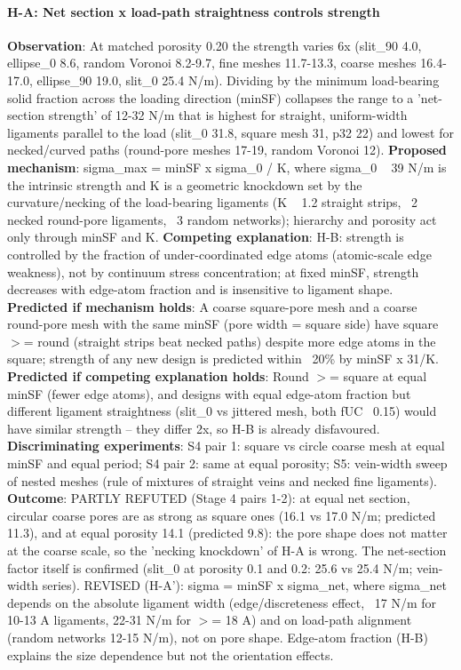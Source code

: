 \paragraph{H-A: Net section x load-path straightness controls strength} \textbf{Observation}: At matched porosity 0.20 the strength varies 6x (slit\_90 4.0, ellipse\_0 8.6, random Voronoi 8.2-9.7, fine meshes 11.7-13.3, coarse meshes 16.4-17.0, ellipse\_90 19.0, slit\_0 25.4 N/m). Dividing by the minimum load-bearing solid fraction across the loading direction (minSF) collapses the range to a 'net-section strength' of 12-32 N/m that is highest for straight, uniform-width ligaments parallel to the load (slit\_0 31.8, square mesh 31, p32 22) and lowest for necked/curved paths (round-pore meshes 17-19, random Voronoi 12). \textbf{Proposed mechanism}: sigma\_max = minSF x sigma\_0 / K, where sigma\_0 ~ 39 N/m is the intrinsic strength and K is a geometric knockdown set by the curvature/necking of the load-bearing ligaments (K ~ 1.2 straight strips, ~2 necked round-pore ligaments, ~3 random networks); hierarchy and porosity act only through minSF and K. \textbf{Competing explanation}: H-B: strength is controlled by the fraction of under-coordinated edge atoms (atomic-scale edge weakness), not by continuum stress concentration; at fixed minSF, strength decreases with edge-atom fraction and is insensitive to ligament shape. \textbf{Predicted if mechanism holds}: A coarse square-pore mesh and a coarse round-pore mesh with the same minSF (pore width = square side) have square $>$= round (straight strips beat necked paths) despite more edge atoms in the square; strength of any new design is predicted within ~20\% by minSF x 31/K. \textbf{Predicted if competing explanation holds}: Round $>$= square at equal minSF (fewer edge atoms), and designs with equal edge-atom fraction but different ligament straightness (slit\_0 vs jittered mesh, both fUC ~0.15) would have similar strength -- they differ 2x, so H-B is already disfavoured. \textbf{Discriminating experiments}: S4 pair 1: square vs circle coarse mesh at equal minSF and equal period; S4 pair 2: same at equal porosity; S5: vein-width sweep of nested meshes (rule of mixtures of straight veins and necked fine ligaments). \textbf{Outcome}: PARTLY REFUTED (Stage 4 pairs 1-2): at equal net section, circular coarse pores are as strong as square ones (16.1 vs 17.0 N/m; predicted 11.3), and at equal porosity 14.1 (predicted 9.8): the pore shape does not matter at the coarse scale, so the 'necking knockdown' of H-A is wrong. The net-section factor itself is confirmed (slit\_0 at porosity 0.1 and 0.2: 25.6 vs 25.4 N/m; vein-width series). REVISED (H-A'): sigma = minSF x sigma\_net, where sigma\_net depends on the absolute ligament width (edge/discreteness effect, ~17 N/m for 10-13 A ligaments, 22-31 N/m for $>$= 18 A) and on load-path alignment (random networks 12-15 N/m), not on pore shape. Edge-atom fraction (H-B) explains the size dependence but not the orientation effects.

